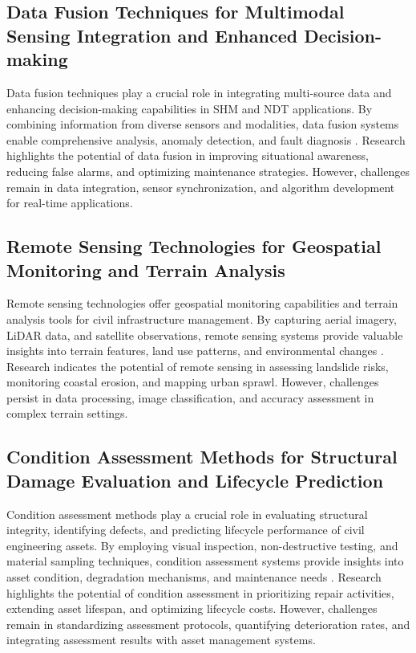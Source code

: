 \documentclass[journal, a4paper]{IEEEtran}
\begin{document}
\subsection{Data Fusion Techniques for Multimodal Sensing Integration and Enhanced Decision-making}
Data fusion techniques play a crucial role in integrating multi-source data and enhancing decision-making
capabilities in SHM and NDT applications. By combining information from diverse sensors and modalities, data fusion
systems enable comprehensive analysis, anomaly detection, and fault diagnosis \cite{willmann_health_2023} \cite{zhang_structural_2021} \cite{bevan_automated_2022}.
Research highlights the potential of data fusion in improving situational awareness, reducing false alarms,
and optimizing maintenance strategies. However, challenges remain in data integration, sensor synchronization,
and algorithm development for real-time applications. 

\subsection{Remote Sensing Technologies for Geospatial Monitoring and Terrain Analysis}
Remote sensing technologies offer geospatial monitoring capabilities and terrain analysis tools for civil
infrastructure management. By capturing aerial imagery, LiDAR data, and satellite observations,
remote sensing systems provide valuable insights into terrain features, land use patterns, and environmental changes
\cite{tang_explainable_2023} \cite{fang_structural_2024} \cite{wang_fatigue_2023}. Research indicates the potential of remote sensing in assessing landslide risks,
monitoring coastal erosion, and mapping urban sprawl. However, challenges persist in data processing,
image classification, and accuracy assessment in complex terrain settings.

\subsection{Condition Assessment Methods for Structural Damage Evaluation and Lifecycle Prediction}
Condition assessment methods play a crucial role in evaluating structural integrity, identifying defects,
and predicting lifecycle performance of civil engineering assets. By employing visual inspection, non-destructive testing,
and material sampling techniques, condition assessment systems provide insights into asset condition, degradation mechanisms,
and maintenance needs \cite{dong_ultrasonic_2022} \cite{li_physics-informed_2023} \cite{yifei_structure_2023}. Research highlights the potential of condition assessment in prioritizing repair
activities, extending asset lifespan, and optimizing lifecycle costs. However, challenges remain in standardizing assessment
protocols, quantifying deterioration rates, and integrating assessment results with asset management systems.
\end{document}
